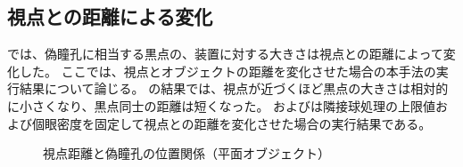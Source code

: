 \newpage
\subsection{視点との距離による変化}
\label{SSCameraDist}

では、偽瞳孔に相当する黒点の、装置に対する大きさは視点との距離によって変化した。
ここでは、視点とオブジェクトの距離を変化させた場合の本手法の実行結果について論じる。
の結果では、視点が近づくほど黒点の大きさは相対的に小さくなり、黒点同士の距離は短くなった。
およびは隣接球処理の上限値および個眼密度を固定して視点との距離を変化させた場合の実行結果である。

\begin{figure}[htbp]
  \centering
{}
  \caption{視点距離と偽瞳孔の位置関係（平面オブジェクト）}
  \label{FDistancePlane}
\end{figure}

